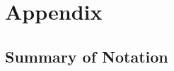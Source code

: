 \documentclass[ba]{imsart}
\begin{document}
	
	\clearpage
	
	\bigskip
	
	
	
	
	\clearpage
	
	\section*{Appendix}
	\label{sec:appendix}
	
	\hypertarget{app:glossary}{%
	\subsection{Summary of Notation}\label{app:glossary}}
	
\end{document}
